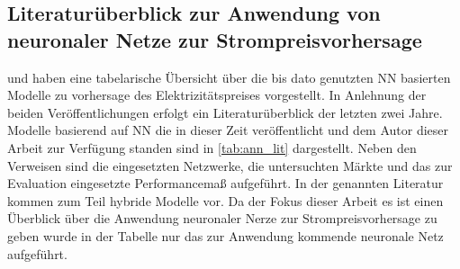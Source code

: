 \subsection{Literaturüberblick zur Anwendung von neuronaler Netze zur Strompreisvorhersage}\label{sec:literaturueberblick}

\citet{Aggarwal2009} und \citet{Panapakidis2016} haben eine tabelarische Übersicht über die bis dato genutzten NN basierten Modelle zu vorhersage des Elektrizitätspreises vorgestellt. In Anlehnung der beiden Veröffentlichungen erfolgt ein Literaturüberblick der letzten zwei Jahre. 
Modelle basierend auf NN die in dieser Zeit veröffentlicht und dem Autor dieser Arbeit zur Verfügung standen sind in \autoref{tab:ann_lit} dargestellt. Neben den Verweisen sind die eingesetzten Netzwerke, die untersuchten Märkte und das zur Evaluation eingesetzte Performancemaß aufgeführt. In der genannten Literatur kommen zum Teil hybride Modelle vor. Da der Fokus dieser Arbeit es ist einen Überblick über die Anwendung neuronaler Nerze zur Strompreisvorhersage zu geben wurde in der Tabelle nur das zur Anwendung kommende neuronale Netz aufgeführt. 






